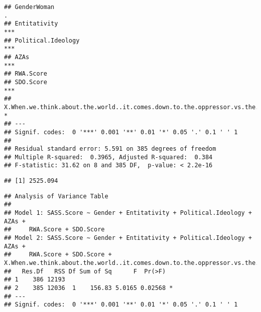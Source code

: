 \documentclass[
  doc,draftall]{apa6}
\begin{document}
\begin{verbatim}
## GenderWoman                                                                        .  
## Entitativity                                                                       ***
## Political.Ideology                                                                 ***
## AZAs                                                                               ***
## RWA.Score                                                                             
## SDO.Score                                                                          ***
## X.When.we.think.about.the.world..it.comes.down.to.the.oppressor.vs.the.oppressed.. *  
## ---
## Signif. codes:  0 '***' 0.001 '**' 0.01 '*' 0.05 '.' 0.1 ' ' 1
## 
## Residual standard error: 5.591 on 385 degrees of freedom
## Multiple R-squared:  0.3965, Adjusted R-squared:  0.384 
## F-statistic: 31.62 on 8 and 385 DF,  p-value: < 2.2e-16
\end{verbatim}

\begin{verbatim}
## [1] 2525.094
\end{verbatim}

\begin{verbatim}
## Analysis of Variance Table
## 
## Model 1: SASS.Score ~ Gender + Entitativity + Political.Ideology + AZAs + 
##     RWA.Score + SDO.Score
## Model 2: SASS.Score ~ Gender + Entitativity + Political.Ideology + AZAs + 
##     RWA.Score + SDO.Score + X.When.we.think.about.the.world..it.comes.down.to.the.oppressor.vs.the.oppressed..
##   Res.Df   RSS Df Sum of Sq      F  Pr(>F)  
## 1    386 12193                              
## 2    385 12036  1    156.83 5.0165 0.02568 *
## ---
## Signif. codes:  0 '***' 0.001 '**' 0.01 '*' 0.05 '.' 0.1 ' ' 1
\end{verbatim}
\end{document}
